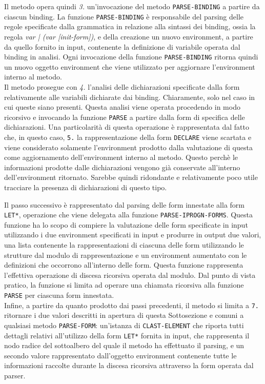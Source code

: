 Il metodo opera quindi \textit{3.} un’invocazione del metodo \texttt
{PARSE-BINDING} a partire da ciascun binding. La funzione \texttt
{PARSE-BINDING} è responsabile del parsing delle regole specificate dalla
grammatica in relazione alla sintassi dei binding, ossia la regola \textit
{var | (var [init-form])}, e della creazione un nuovo environment, a partire
da quello fornito in input, contenente la definizione di variabile operata dal
binding in analisi. Ogni invocazione della funzione \texttt{PARSE-BINDING}
ritorna quindi un nuovo oggetto environment che viene utilizzato per
aggiornare l’environment interno al metodo.\\

Il metodo prosegue con \textit{4.} l’analisi delle dichiarazioni specificate
dalla form relativamente alle variabili dichiarate dai binding. Chiaramente,
solo nel caso in cui queste siano presenti. Questa analisi viene operata
procedendo in modo ricorsivo e invocando la funzione \texttt{PARSE} a partire
dalla form di specifica delle dichiarazioni. Una particolarità di questa
operazione è rappresentata dal fatto che, in questo caso, \texttt{5.} la
rappresentazione della form \texttt{DECLARE} viene scartata e viene
considerato solamente l'environment prodotto dalla valutazione di questa come
aggiornamento dell'environment interno al metodo. Questo perchè le
informazioni prodotte dalle dichiarazioni vengono già conservate all'interno
dell'environment ritornato. Sarebbe quindi ridondante e relativamente poco
utile tracciare la presenza di dichiarazioni di questo tipo.

Il passo successivo è rappresentato dal parsing delle form innestate alla form
\texttt{LET*}, operazione che viene delegata alla funzione \texttt
{PARSE-IPROGN-FORMS}. Questa funzione ha lo scopo di compiere la valutazione
delle form specificate in input utilizzando i due environment specificati in
input e produrre in output due valori, una lista contenente la
rappresentazioni di ciascuna delle form utilizzando le strutture dal modulo di
rappresentazione e un environment aumentato con le definizioni che occorrono
all’interno delle form. Questa funzione rappresenta l'effettiva operazione di
discesa ricorsiva operata dal modulo. Dal punto di vista pratico, la funzione
si limita ad operare una chiamata ricorsiva alla funzione \texttt{PARSE} per
ciascuna form innestata.\\

Infine, a partire da quanto prodotto dai passi precedenti, il metodo si limita
a \texttt{7.} ritornare i due valori descritti in apertura di questa
Sottosezione e comuni a qualsiasi metodo \texttt{PARSE-FORM}: un'istanza di
\texttt{CLAST-ELEMENT} che riporta tutti dettagli relativi all'utilizzo della
form \texttt{LET*} fornita in input, che rappresenta il nodo radice del
sottoalbero del quale il metodo ha effettuato il parsing, e un secondo valore
rappresentato dall'oggetto environment contenente tutte le informazioni
raccolte durante la discesa ricorsiva attraverso la form operata dal parser.\\

